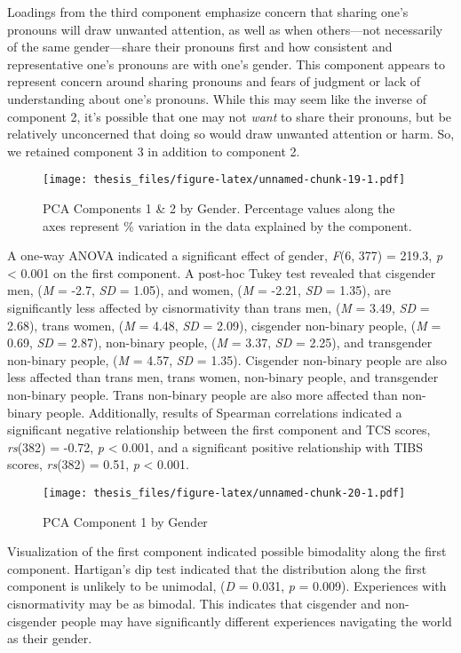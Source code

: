 \documentclass[12pt,twoside]{reedthesis}
\begin{document}
Loadings from the third component emphasize concern that sharing one's pronouns will draw unwanted attention, as well as when others---not necessarily of the same gender---share their pronouns first and how consistent and representative one's pronouns are with one's gender. This component appears to represent concern around sharing pronouns and fears of judgment or lack of understanding about one's pronouns. While this may seem like the inverse of component 2, it's possible that one may not \emph{want} to share their pronouns, but be relatively unconcerned that doing so would draw unwanted attention or harm. So, we retained component 3 in addition to component 2.
\begin{figure}
\centering
\texttt{[image: thesis\_files/figure-latex/unnamed-chunk-19-1.pdf]}
\caption{\label{fig:unnamed-chunk-19}PCA Components 1 \& 2 by Gender. Percentage values along the axes represent \% variation in the data explained by the component.}
\end{figure}
A one-way ANOVA indicated a significant effect of gender, \emph{F}(6, 377) = 219.3, \emph{p} \textless{} 0.001 on the first component. A post-hoc Tukey test revealed that cisgender men, (\emph{M} = -2.7, \emph{SD} = 1.05), and women, (\emph{M} = -2.21, \emph{SD} = 1.35), are significantly less affected by cisnormativity than trans men, (\emph{M} = 3.49, \emph{SD} = 2.68), trans women, (\emph{M} = 4.48, \emph{SD} = 2.09), cisgender non-binary people, (\emph{M} = 0.69, \emph{SD} = 2.87), non-binary people, (\emph{M} = 3.37, \emph{SD} = 2.25), and transgender non-binary people, (\emph{M} = 4.57, \emph{SD} = 1.35). Cisgender non-binary people are also less affected than trans men, trans women, non-binary people, and transgender non-binary people. Trans non-binary people are also more affected than non-binary people. Additionally, results of Spearman correlations indicated a significant negative relationship between the first component and TCS scores, \emph{rs}(382) = -0.72, \emph{p} \textless{} 0.001, and a significant positive relationship with TIBS scores, \emph{rs}(382) = 0.51, \emph{p} \textless{} 0.001.
\begin{figure}
\centering
\texttt{[image: thesis\_files/figure-latex/unnamed-chunk-20-1.pdf]}
\caption{\label{fig:unnamed-chunk-20}PCA Component 1 by Gender}
\end{figure}
Visualization of the first component indicated possible bimodality along the first component. Hartigan's dip test indicated that the distribution along the first component is unlikely to be unimodal, (\emph{D} = 0.031, \emph{p} = 0.009). Experiences with cisnormativity may be as bimodal. This indicates that cisgender and non-cisgender people may have significantly different experiences navigating the world as their gender.
\end{document}
